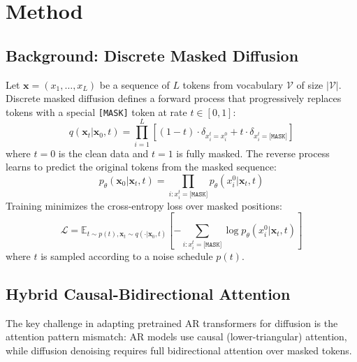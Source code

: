\documentclass{article}
\newcommand{\mask}{\texttt{[MASK]}}
\newcommand{\E}{\mathbb{E}}
\newcommand{\V}{\mathcal{V}}
\begin{document}
\section{Method}
\label{sec:method}

\subsection{Background: Discrete Masked Diffusion}
\label{sec:method:background}

Let $\mathbf{x} = (x_1, \ldots, x_L)$ be a sequence of $L$ tokens from vocabulary $\V$ of size $|\V|$.
Discrete masked diffusion defines a forward process that progressively replaces tokens with a special \mask{} token at rate $t \in [0, 1]$:
\begin{equation}
    q(\mathbf{x}_t | \mathbf{x}_0, t) = \prod_{i=1}^{L} \left[ (1-t) \cdot \delta_{x_i^t = x_i^0} + t \cdot \delta_{x_i^t = \mask} \right]
\end{equation}
where $t=0$ is the clean data and $t=1$ is fully masked.
The reverse process learns to predict the original tokens from the masked sequence:
\begin{equation}
    p_\theta(\mathbf{x}_0 | \mathbf{x}_t, t) = \prod_{i: x_i^t = \mask} p_\theta(x_i^0 | \mathbf{x}_t, t)
\end{equation}
Training minimizes the cross-entropy loss over masked positions:
\begin{equation}
    \mathcal{L} = \E_{t \sim p(t), \mathbf{x}_t \sim q(\cdot|\mathbf{x}_0, t)} \left[ -\sum_{i: x_i^t = \mask} \log p_\theta(x_i^0 | \mathbf{x}_t, t) \right]
    \label{eq:loss}
\end{equation}
where $t$ is sampled according to a noise schedule $p(t)$.

\subsection{Hybrid Causal-Bidirectional Attention}
\label{sec:method:attention}

The key challenge in adapting pretrained AR transformers for diffusion is the attention pattern mismatch: AR models use causal (lower-triangular) attention, while diffusion denoising requires full bidirectional attention over masked tokens.
\end{document}
